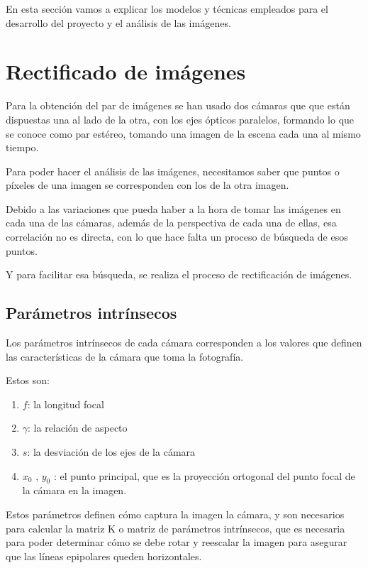
En esta sección vamos a explicar los modelos y técnicas empleados para el desarrollo del proyecto y el análisis de las imágenes.

\section{Rectificado de imágenes}

Para la obtención del par de imágenes se han usado dos cámaras que que están dispuestas una al lado de la otra, con los ejes ópticos paralelos, formando lo que se conoce como par estéreo, tomando una imagen de la escena cada una al mismo tiempo.

Para poder hacer el análisis de las imágenes, necesitamos saber que puntos o píxeles de una imagen se corresponden con los de la otra imagen.

Debido a las variaciones que pueda haber a la hora de tomar las imágenes en cada una de las cámaras, además de la perspectiva de cada una de ellas, esa correlación no es directa, con lo que hace falta un proceso de búsqueda de esos puntos.

Y para facilitar esa búsqueda, se realiza el proceso de rectificación de imágenes.

\subsection{Parámetros intrínsecos}
Los parámetros intrínsecos de cada cámara corresponden a los valores que definen las características de la cámara que toma la fotografía.

Estos son:
\begin{enumerate}
	\item $f$: la longitud focal
	\item $\gamma$: la relación de aspecto
	\item $s$: la desviación de los ejes de la cámara
	\item $x_{0}$ , $y_{0}$ : el punto principal, que es la proyección ortogonal del punto focal de la cámara en la imagen.
\end{enumerate}

Estos parámetros definen cómo captura la imagen la cámara, y son necesarios para calcular la matriz K o matriz de parámetros intrínsecos, que es necesaria para poder determinar cómo se debe rotar y reescalar la imagen para asegurar que las líneas epipolares queden horizontales.

